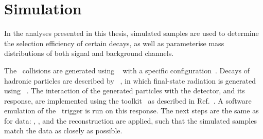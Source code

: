 \clearpage
\section{Simulation}
\label{sec:simulation}

In the analyses presented in this thesis, simulated samples are used to determine the selection efficiency of certain decays, as well as parameterise mass distributions of both signal and background channels.

The \proton\proton~collisions are generated using \pythia~\cite{Sjostrand:2007gs,Sjostrand:2006za} with a specific \lhcb configuration~\cite{LHCb-PROC-2010-056}.
Decays of hadronic particles are described by \evtgen~\cite{Lange:2001uf}, in which final-state radiation is generated using \photos~\cite{Golonka:2005pn}.
The interaction of the generated particles with the detector, and its response, are implemented using the \geant toolkit~\cite{Allison:2006ve,Agostinelli:2002hh} as described in Ref.~\cite{LHCb-PROC-2011-006}.
A software emulation of the \lzero~trigger is run on this response.
The next steps are the same as for data: \hltone, \hlttwo, and the reconstruction are applied, such that the simulated samples match the data as closely as possible.

